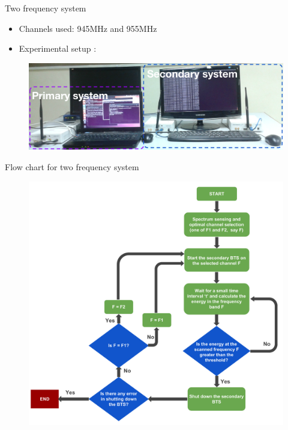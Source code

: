 \documentclass{beamer}
\begin{document}
  
  
  
  
  \begin{frame}{Two frequency system}
    \begin{itemize}
      \item Channels used: 945MHz and 955MHz
      \item Experimental setup :
    \end{itemize}
    \begin{figure}
      \centering
      \includegraphics[width=0.97\linewidth]{img/freq2}
    \end{figure}
  \end{frame}
  
  \begin{frame}{Flow chart for two frequency system}
    \begin{figure}
      \centering
      \includegraphics[height=0.9\textheight]{img/freqSys2}
    \end{figure}
  \end{frame}
\end{document}
